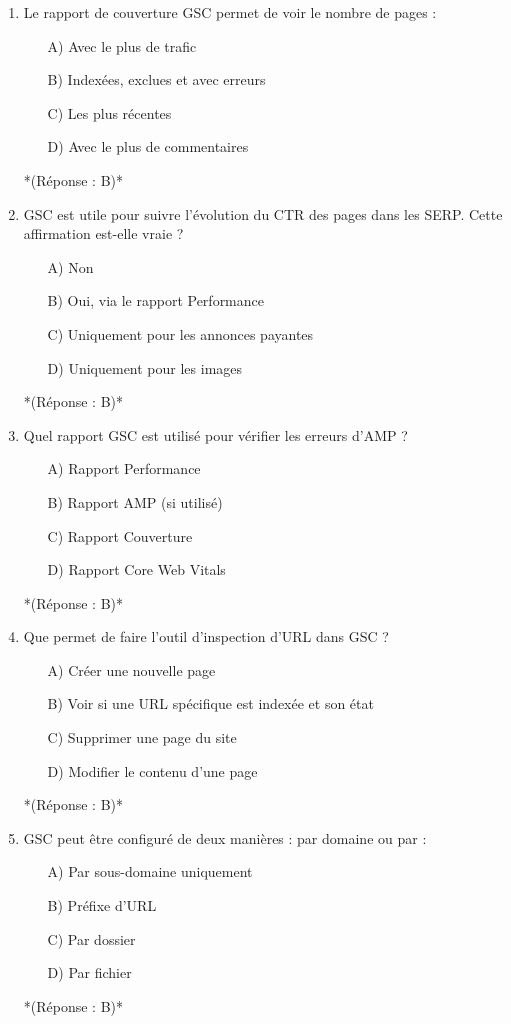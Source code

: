 \documentclass[12pt,a4paper,twoside]{report}
\begin{document}
\begin{enumerate}
    \item Le rapport de couverture GSC permet de voir le nombre de pages :
    \begin{itemize}
        \item[A)] Avec le plus de trafic
        \item[B)] Indexées, exclues et avec erreurs
        \item[C)] Les plus récentes
        \item[D)] Avec le plus de commentaires
    \end{itemize}
    *(Réponse : B)*

    \item GSC est utile pour suivre l'évolution du CTR des pages dans les SERP. Cette affirmation est-elle vraie ?
    \begin{itemize}
        \item[A)] Non
        \item[B)] Oui, via le rapport Performance
        \item[C)] Uniquement pour les annonces payantes
        \item[D)] Uniquement pour les images
    \end{itemize}
    *(Réponse : B)*

    \item Quel rapport GSC est utilisé pour vérifier les erreurs d'AMP ?
    \begin{itemize}
        \item[A)] Rapport Performance
        \item[B)] Rapport AMP (si utilisé)
        \item[C)] Rapport Couverture
        \item[D)] Rapport Core Web Vitals
    \end{itemize}
    *(Réponse : B)*

    \item Que permet de faire l'outil d'inspection d'URL dans GSC ?
    \begin{itemize}
        \item[A)] Créer une nouvelle page
        \item[B)] Voir si une URL spécifique est indexée et son état
        \item[C)] Supprimer une page du site
        \item[D)] Modifier le contenu d'une page
    \end{itemize}
    *(Réponse : B)*

    \item GSC peut être configuré de deux manières : par domaine ou par :
    \begin{itemize}
        \item[A)] Par sous-domaine uniquement
        \item[B)] Préfixe d'URL
        \item[C)] Par dossier
        \item[D)] Par fichier
    \end{itemize}
    *(Réponse : B)*


\end{enumerate}
\end{document}
